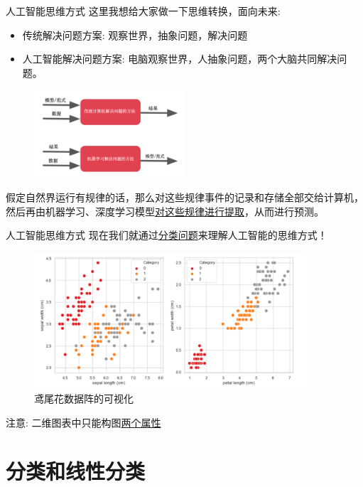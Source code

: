 \documentclass[handout]{ctexbeamer}
\begin{document}
\begin{frame}{人工智能思维方式}
	这里我想给大家做一下思维转换，面向未来:
	\begin{itemize}
		\item 传统解决问题方案: 观察世界，抽象问题，解决问题
		\item 人工智能解决问题方案: 电脑观察世界，人抽象问题，两个大脑共同解决问题。
	\end{itemize}
	\begin{figure}[H]
		\centering
		\includegraphics[width=0.5\textwidth]{fig/C1MLbigpct}
	\end{figure}
	假定自然界运行有规律的话，那么对这些规律事件的记录和存储全部交给计算机，然后再由机器学习、深度学习模型\underline{对这些规律进行提取}，从而进行预测。
\end{frame}

\begin{frame}{人工智能思维方式}
现在我们就通过\underline{分类问题}来理解人工智能的思维方式！
\begin{figure}[H]
	\centering
	\includegraphics[width=0.9\textwidth]{fig/C2preIris}
	\caption{鸢尾花数据阵的可视化}
\end{figure}	
注意: 二维图表中只能构图\underline{两个属性}
\end{frame}


\section{分类和线性分类}
\end{document}

